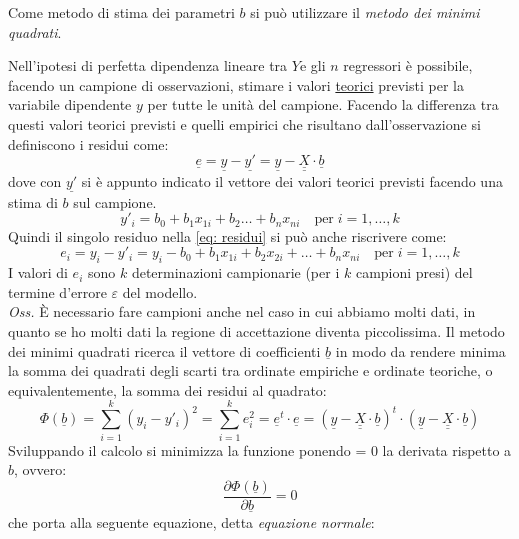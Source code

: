 \documentclass[]{article}
\def\doubleunderline#1{\underline{\underline{#1}}}
\begin{document}
Come metodo di stima dei parametri $b$ si può utilizzare il \textit{metodo dei minimi quadrati}.

Nell'ipotesi di perfetta dipendenza lineare tra $Y$e gli $n$ regressori è possibile, facendo un campione di osservazioni, stimare i valori \underline{teorici} previsti per la variabile dipendente $y$ per tutte le unità del campione. Facendo la differenza tra questi valori teorici previsti e quelli empirici che risultano dall'osservazione si definiscono i residui come:
\begin{equation}
\underline{e} = \underline{y} - \underline{y'} = \underline{y} - \doubleunderline{X} \cdot \underline{b}
\label{eq: residui}
\end{equation}
dove con $\underline{y'}$ si è appunto indicato il vettore dei valori teorici previsti facendo una stima di $b$ sul campione.
\begin{equation}
y'_i = b_0 + b_1 x_{1i} + b_2 \dots + b_n x_{ni} \quad \text{per} \; i= 1, \dots, k
\end{equation}
Quindi il singolo residuo nella \eqref{eq: residui} si può anche riscrivere come:
\begin{equation}
e_i = y_i - y'_i = y_i - b_0 + b_1 x_{1i} + b_2 x_{2i} + \dots + b_n x_{ni} \quad \text{per} \; i= 1, \dots, k
\end{equation}
I valori di $e_i$ sono $k$ determinazioni campionarie (per i $k$ campioni presi) del termine d'errore $\varepsilon$ del modello.\\
\textit{Oss.} È necessario fare campioni anche nel caso in cui abbiamo
molti dati, in quanto se ho molti dati la regione di accettazione
diventa piccolissima.
Il metodo dei minimi quadrati ricerca il vettore di coefficienti $\underline{b}$ in modo da rendere minima la somma dei quadrati degli scarti tra ordinate empiriche e ordinate teoriche, o equivalentemente, la somma dei residui al quadrato:
\begin{equation}
\Phi(\underline{b}) = \sum_{i=1}^k (y_i - y'_i)^2 = \sum_{i=1}^k e_i^2 = \underline{e}^t 	\cdot \underline{e} = (\underline{y} - \doubleunderline{X} \cdot \underline{b})^t \cdot (\underline{y} - \doubleunderline{X} \cdot \underline{b})
\end{equation}
Sviluppando il calcolo si minimizza la funzione ponendo = 0 la derivata rispetto a $b$, ovvero:
\begin{equation}
\frac{\partial \Phi(\underline{b})}{\partial \underline{b}} = 0
\end{equation}
che porta alla seguente equazione, detta \textit{equazione normale}:
\end{document}
